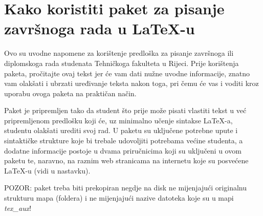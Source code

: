 
\chapter{Kako koristiti paket za pisanje završnoga rada u \LaTeX-u}
Ovo su uvodne napomene za korištenje predloška za pisanje završnoga ili diplomskoga rada studenata Tehničkoga fakulteta u Rijeci. Prije korištenja paketa, pročitajte ovaj tekst jer će vam dati nužne uvodne informacije, znatno vam olakšati i ubrzati uređivanje teksta nakon toga, pri čemu će vas i voditi kroz uporabu ovoga paketa na praktičan način.

Paket je pripremljen tako da student što prije može pisati vlastiti tekst u već pripremljenom predlošku koji će, uz minimalno učenje sintakse \LaTeX-a, studentu olakšati urediti svoj rad. U paketu su uključene potrebne upute i sintaktičke strukture koje bi trebale udovoljiti potrebama većine studenta, a dodatne informacije postoje u dvama priručnicima koji su uključeni u ovom paketu te, naravno, na raznim web stranicama na internetu koje su posvećene \LaTeX-u (vidi u nastavku).

{\color{red} POZOR: paket treba biti prekopiran negdje na disk ne mijenjajući originalnu strukturu mapa (foldera) i ne mijenjajući nazive datoteka koje su u mapi \emph{tex\_aux}!}


